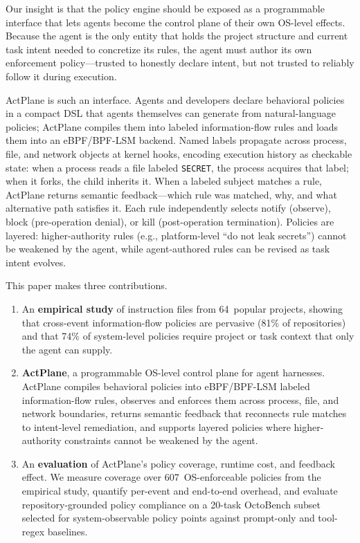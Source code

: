 Our insight is that the policy engine should be exposed as a
programmable interface that lets agents become the control plane of
their own OS-level effects. Because the agent is the only entity
that holds the project structure and current task intent needed to
concretize its rules, the agent must author its own enforcement
policy---trusted to honestly declare intent, but not trusted to
reliably follow it during execution.

ActPlane is such an interface. Agents and developers declare behavioral
policies in a compact DSL that agents themselves can generate from
natural-language policies; ActPlane compiles them into labeled
information-flow rules and loads them into an eBPF/BPF-LSM backend. Named
labels propagate across process, file, and network objects at kernel hooks,
encoding execution history as checkable state: when a process reads a file
labeled \texttt{SECRET}, the process acquires that label; when it forks, the
child inherits it. When a labeled subject matches a rule, ActPlane returns
semantic feedback---which rule was matched, why, and what alternative path
satisfies it. Each rule independently selects notify (observe), block
(pre-operation denial), or kill (post-operation termination).
Policies are layered: higher-authority rules (e.g., platform-level
``do not leak secrets'') cannot be weakened by the agent, while
agent-authored rules can be revised as task intent evolves.

This paper makes three contributions.

\begin{enumerate}
\item An \textbf{empirical study} of instruction files from 64~popular
projects, showing that cross-event information-flow policies are pervasive
(81\% of repositories) and that 74\% of system-level policies require
project or task context that only the agent can supply.

\item \textbf{ActPlane}, a programmable OS-level control plane for agent
harnesses. ActPlane compiles behavioral policies into eBPF/BPF-LSM labeled
information-flow rules, observes and enforces them across process, file,
and network boundaries, returns semantic feedback that reconnects rule
matches to intent-level remediation, and supports layered policies where
higher-authority constraints cannot be weakened by the agent.

\item An \textbf{evaluation} of ActPlane's policy coverage, runtime
cost, and feedback effect. We measure coverage over 607~OS-enforceable
policies from the empirical study, quantify per-event and end-to-end
overhead, and evaluate repository-grounded policy compliance on a 20-task
OctoBench subset selected for system-observable policy points against
prompt-only and tool-regex baselines.
\end{enumerate}
